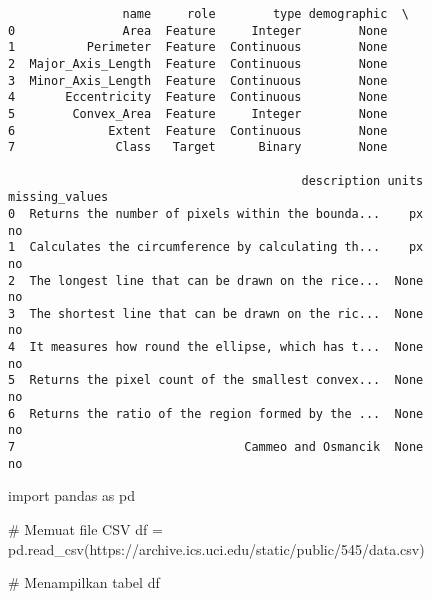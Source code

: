 \documentclass[
  letterpaper,
]{krantz}
\makeatletter
\newenvironment{Shaded}{\begin{snugshade}}{\end{snugshade}}
\newcommand{\CommentTok}[1]{\textcolor[rgb]{0.37,0.37,0.37}{#1}}
\newcommand{\ImportTok}[1]{\textcolor[rgb]{0.00,0.46,0.62}{#1}}
\newcommand{\NormalTok}[1]{\textcolor[rgb]{0.00,0.23,0.31}{#1}}
\newcommand{\OperatorTok}[1]{\textcolor[rgb]{0.37,0.37,0.37}{#1}}
\newcommand{\StringTok}[1]{\textcolor[rgb]{0.13,0.47,0.30}{#1}}
\newenvironment{kframe}{%
\medskip{}
\setlength{\fboxsep}{.8em}
 \def\at@end@of@kframe{}%
 \ifinner\ifhmode%
  \def\at@end@of@kframe{\end{minipage}}%
  \begin{minipage}{\columnwidth}%
 \fi\fi%
 \def\FrameCommand##1{\hskip\@totalleftmargin \hskip-\fboxsep
 \colorbox{shadecolor}{##1}\hskip-\fboxsep
     \hskip-\linewidth \hskip-\@totalleftmargin \hskip\columnwidth}%
 \MakeFramed {\advance\hsize-\width
   \@totalleftmargin\z@ \linewidth\hsize
   \@setminipage}}%
 {\par\unskip\endMakeFramed%
 \at@end@of@kframe}
\renewenvironment{Shaded}{\begin{kframe}}{\end{kframe}}
\makeatother
\begin{document}
\begin{verbatim}
                name     role        type demographic  \
0               Area  Feature     Integer        None   
1          Perimeter  Feature  Continuous        None   
2  Major_Axis_Length  Feature  Continuous        None   
3  Minor_Axis_Length  Feature  Continuous        None   
4       Eccentricity  Feature  Continuous        None   
5        Convex_Area  Feature     Integer        None   
6             Extent  Feature  Continuous        None   
7              Class   Target      Binary        None   

                                         description units missing_values  
0  Returns the number of pixels within the bounda...    px             no  
1  Calculates the circumference by calculating th...    px             no  
2  The longest line that can be drawn on the rice...  None             no  
3  The shortest line that can be drawn on the ric...  None             no  
4  It measures how round the ellipse, which has t...  None             no  
5  Returns the pixel count of the smallest convex...  None             no  
6  Returns the ratio of the region formed by the ...  None             no  
7                                Cammeo and Osmancik  None             no  
\end{verbatim}

\begin{Shaded}
\begin{Highlighting}[]
\ImportTok{import}\NormalTok{ pandas }\ImportTok{as}\NormalTok{ pd}

\CommentTok{\# Memuat file CSV}
\NormalTok{df }\OperatorTok{=}\NormalTok{ pd.read\_csv(}\StringTok{\textquotesingle{}https://archive.ics.uci.edu/static/public/545/data.csv\textquotesingle{}}\NormalTok{)}

\CommentTok{\# Menampilkan tabel}
\NormalTok{df}
\end{Highlighting}
\end{Shaded}
\end{document}
